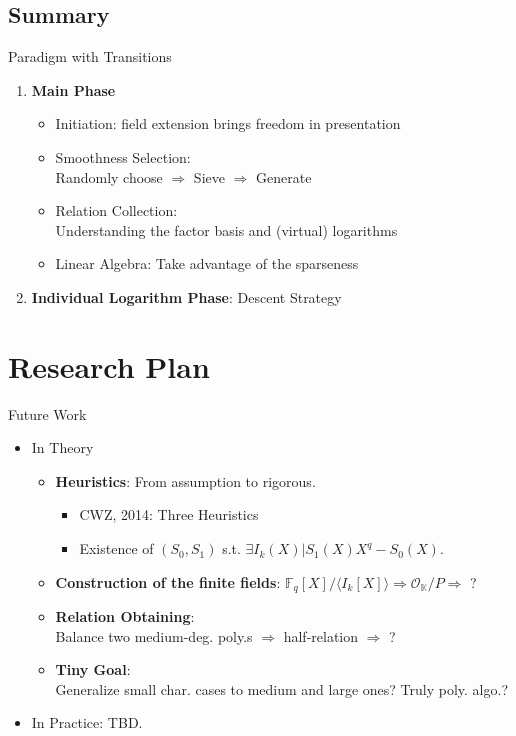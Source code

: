 \documentclass{beamer}
\begin{document}
	\subsection{Summary}
		\begin{frame}{Paradigm with Transitions}
			\begin{enumerate}
				\item \textbf{Main Phase}
				\begin{itemize}
					\item Initiation: field extension brings freedom in presentation
					\item Smoothness Selection: \\Randomly choose $\Rightarrow$ Sieve $\Rightarrow$ Generate
					\item Relation Collection: \\Understanding the factor basis and (virtual) logarithms
					\item Linear Algebra: Take advantage of the sparseness
				\end{itemize}
				\item \textbf{Individual Logarithm Phase}: Descent Strategy
			\end{enumerate}
		\end{frame}
\section{Research Plan}
	\begin{frame}{Future Work}
		\begin{itemize}
			\item In Theory
			\begin{itemize}
				\item \textbf{Heuristics}: From assumption to rigorous.
					\begin{itemize}
						\item CWZ, 2014: Three Heuristics
						\item Existence of $(S_0, S_1)$ s.t. $\exists I_k(X)|S_1(X)X^q - S_0(X)$.
					\end{itemize}
				\item \textbf{Construction of the finite fields}:
					$\mathbb{F}_q[X]/\langle I_k[X]\rangle \Rightarrow \mathcal{O}_\mathbb{K}/P \Rightarrow$ ?
				\item \textbf{Relation Obtaining}:\\
					Balance two medium-deg. poly.s $\Rightarrow$ half-relation $\Rightarrow$ ? 
				\item \textbf{Tiny Goal}:\\
					Generalize small char. cases to medium and large ones? Truly poly. algo.?
			\end{itemize}
			\item In Practice: TBD.
		\end{itemize}
	\end{frame}
\end{document}
